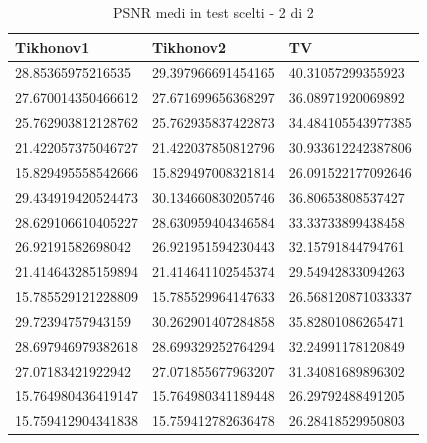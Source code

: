 \documentclass[12pt]{article}
\begin{document}
    \begin{table}[!ht]
    \centering
    \begin{tabular}{|l|l|l|}
    \hline
        Tikhonov1 & Tikhonov2 & TV \\ \hline
        28.85365975216535 & 29.397966691454165 & 40.31057299355923 \\ \hline
        27.670014350466612 & 27.671699656368297 & 36.08971920069892 \\ \hline
        25.762903812128762 & 25.762935837422873 & 34.484105543977385 \\ \hline
        21.422057375046727 & 21.422037850812796 & 30.933612242387806 \\ \hline
        15.829495558542666 & 15.829497008321814 & 26.091522177092646 \\ \hline
        29.434919420524473 & 30.134660830205746 & 36.80653808537427 \\ \hline
        28.629106610405227 & 28.630959404346584 & 33.33733899438458 \\ \hline
        26.92191582698042 & 26.921951594230443 & 32.15791844794761 \\ \hline
        21.414643285159894 & 21.414641102545374 & 29.54942833094263 \\ \hline
        15.785529121228809 & 15.785529964147633 & 26.568120871033337 \\ \hline
        29.72394757943159 & 30.262901407284858 & 35.82801086265471 \\ \hline
        28.697946979382618 & 28.699329252764294 & 32.24991178120849 \\ \hline
        27.07183421922942 & 27.071855677963207 & 31.34081689896302 \\ \hline
        15.764980436419147 & 15.764980341189448 & 26.29792488491205 \\ \hline
        15.759412904341838 & 15.759412782636478 & 26.28418529950803 \\ \hline
    \end{tabular}
    \caption{PSNR medi in test scelti - 2 di 2}
    \label{table:3}
    \end{table}
    \newpage
\end{document}
